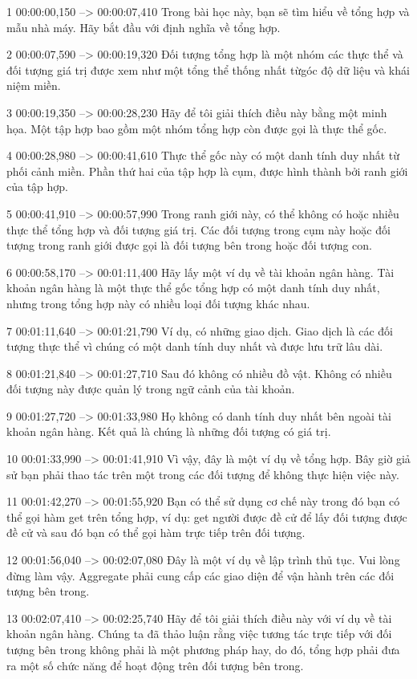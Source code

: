 1
00:00:00,150 --> 00:00:07,410
Trong bài học này, bạn sẽ tìm hiểu về tổng hợp và mẫu nhà máy.  Hãy bắt đầu với định nghĩa về tổng hợp.

2
00:00:07,590 --> 00:00:19,320
Đối tượng tổng hợp là một nhóm các thực thể và đối tượng giá trị được xem như một tổng thể thống nhất từ ​​góc độ dữ liệu và khái niệm miền.

3
00:00:19,350 --> 00:00:28,230
Hãy để tôi giải thích điều này bằng một minh họa.  Một tập hợp bao gồm một nhóm tổng hợp còn được gọi là thực thể gốc.

4
00:00:28,980 --> 00:00:41,610
Thực thể gốc này có một danh tính duy nhất từ ​​phối cảnh miền.  Phần thứ hai của tập hợp là cụm, được hình thành bởi ranh giới của tập hợp.

5
00:00:41,910 --> 00:00:57,990
Trong ranh giới này, có thể không có hoặc nhiều thực thể tổng hợp và đối tượng giá trị.  Các đối tượng trong cụm này hoặc đối tượng trong ranh giới được gọi là đối tượng bên trong hoặc đối tượng con.

6
00:00:58,170 --> 00:01:11,400
Hãy lấy một ví dụ về tài khoản ngân hàng.  Tài khoản ngân hàng là một thực thể gốc tổng hợp có một danh tính duy nhất, nhưng trong tổng hợp này có nhiều loại đối tượng khác nhau.

7
00:01:11,640 --> 00:01:21,790
Ví dụ, có những giao dịch.  Giao dịch là các đối tượng thực thể vì chúng có một danh tính duy nhất và được lưu trữ lâu dài.

8
00:01:21,840 --> 00:01:27,710
Sau đó không có nhiều đồ vật.  Không có nhiều đối tượng này được quản lý trong ngữ cảnh của tài khoản.

9
00:01:27,720 --> 00:01:33,980
Họ không có danh tính duy nhất bên ngoài tài khoản ngân hàng.  Kết quả là chúng là những đối tượng có giá trị.

10
00:01:33,990 --> 00:01:41,910
Vì vậy, đây là một ví dụ về tổng hợp.  Bây giờ giả sử bạn phải thao tác trên một trong các đối tượng để không thực hiện việc này.

11
00:01:42,270 --> 00:01:55,920
Bạn có thể sử dụng cơ chế này trong đó bạn có thể gọi hàm get trên tổng hợp, ví dụ: get người được đề cử để lấy đối tượng được đề cử và sau đó bạn có thể gọi hàm trực tiếp trên đối tượng.

12
00:01:56,040 --> 00:02:07,080
Đây là một ví dụ về lập trình thủ tục.  Vui lòng đừng làm vậy.  Aggregate phải cung cấp các giao diện để vận hành trên các đối tượng bên trong.

13
00:02:07,410 --> 00:02:25,740
Hãy để tôi giải thích điều này với ví dụ về tài khoản ngân hàng.  Chúng ta đã thảo luận rằng việc tương tác trực tiếp với đối tượng bên trong không phải là một phương pháp hay, do đó, tổng hợp phải đưa ra một số chức năng để hoạt động trên đối tượng bên trong.

